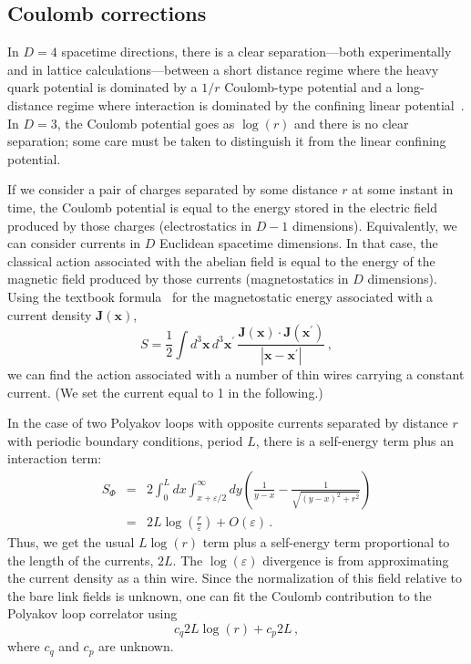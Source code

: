 \documentclass[preprint,aps,prd]{revtex4-2}
\newcommand{\be}{\begin{equation}}
\newcommand{\eq}{\end{equation}}
\begin{document}
\subsection{Coulomb corrections}

In $D=4$ spacetime directions, there is a clear separation---both
experimentally and in lattice calculations---between a
short distance regime where the heavy quark potential is
dominated by a $1/r$ Coulomb-type potential and a
long-distance regime where interaction is dominated by the confining linear
potential~\cite{bali_static_2000,brambilla_effective-field_2005}.
In $D=3$, the Coulomb potential goes as $\log(r)$ and there is no 
clear separation; some care must be taken to distinguish it from
the linear confining potential.

If we consider a pair of charges separated by some
distance $r$ at some instant in time, the Coulomb potential is
equal to the energy stored in the electric
field produced by those charges (electrostatics in $D-1$
dimensions).  Equivalently, we can consider currents
in $D$ Euclidean spacetime dimensions.  In that case,
the classical action associated with the abelian field is equal to the
energy of the magnetic field produced by those currents
(magnetostatics in $D$ dimensions).  Using the textbook
formula~\cite{jackson_classical_1975}
for the magnetostatic energy associated with a current density
$\mathbf{J}(\mathbf{x})$,
%
\be
S = \frac{1}{2} \int d^3\mathbf{x}\, d^3\mathbf{x}^\prime\,
\frac{\mathbf{J}(\mathbf{x}) \cdot
  \mathbf{J}(\mathbf{x}^\prime)}{
  \left| \mathbf{x}-\mathbf{x}^\prime\right|} \, ,
\eq
%
we can find the action associated with a number of thin wires
carrying a constant current. (We set the current equal to 1 in
the following.)

In the case of two Polyakov loops with opposite currents separated
by distance $r$ with periodic boundary conditions, period $L$,
there is a self-energy term plus an interaction term:
%
\begin{eqnarray}
S_\Phi &=& 2 \int_0^L dx \int_{x+\varepsilon/2}^\infty dy
\left(\frac{1}{y-x} -\frac{1}{\sqrt{(y-x)^2 + r^2}}\right) \\
  &=& 2 L \log\left(\frac{r}{\varepsilon}\right) + O(\varepsilon)\, .
\end{eqnarray}
%
Thus, we get the usual $L \log(r)$ term plus a
self-energy term proportional to the length
of the currents, $2L$.  The $\log(\varepsilon)$ divergence
is from approximating the current density as a thin wire.
Since the normalization
of this field relative to the bare link fields is
unknown, one can fit the Coulomb contribution to the
Polyakov loop correlator using
\be
       c_q 2 L \log(r) + c_p 2 L \, , \label{cpf}
\eq
where $c_q$ and $c_p$ are unknown.
\end{document}
